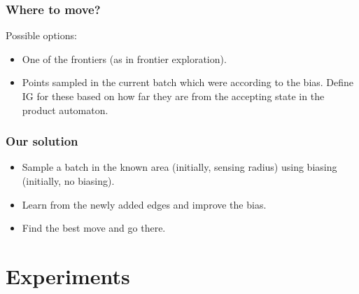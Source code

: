 \documentclass{if-beamer}
\begin{document}
\begin{frame}
	\frametitle{Where to move?}
	Possible options:
	\begin{itemize}
		\item One of the frontiers (as in frontier exploration).
		\item Points sampled in the current batch which were according to the bias. Define IG for these based on how far they are from the accepting state in the product automaton.
	\end{itemize}
\end{frame}

\begin{frame}
	\frametitle{Our solution}
	\begin{itemize}
		\item Sample a batch in the known area (initially, sensing radius) using biasing (initially, no biasing).
		\item Learn from the newly added edges and improve the bias. \textcolor{green}{\cmark}
		\item Find the best move and go there. \textcolor{green}{\cmark}
	\end{itemize}
\end{frame}

\section{Experiments}
\end{document}
